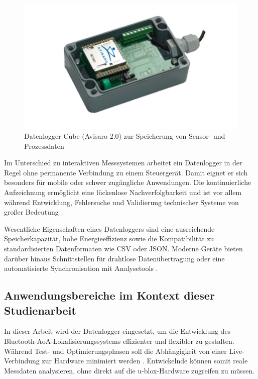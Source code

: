 \documentclass[a4paper, 12pt]{article} %
\begin{document}
\begin{figure}[H]
  \centering
  \includegraphics[width=\linewidth]{images/Datalogger}
  \caption{Datenlogger Cube (Avisaro 2.0) zur Speicherung von Sensor- und Prozessdaten \cite{wikipedia-datalogger}}
  \label{fig:datenlogger_cube}
\end{figure}

Im Unterschied zu interaktiven Messsystemen arbeitet ein Datenlogger in der Regel ohne permanente Verbindung zu einem Steuergerät.  
Damit eignet er sich besonders für mobile oder schwer zugängliche Anwendungen. Die kontinuierliche Aufzeichnung ermöglicht eine lückenlose 
Nachverfolgbarkeit und ist vor allem während Entwicklung, Fehlersuche und Validierung technischer Systeme von großer Bedeutung \cite{dewesoft2024guide}.

Wesentliche Eigenschaften eines Datenloggers sind eine ausreichende Speicherkapazität, hohe Energieeffizienz sowie die Kompatibilität zu 
standardisierten Datenformaten wie \ac{CSV} oder \ac{JSON}. Moderne Geräte bieten darüber hinaus Schnittstellen für drahtlose Datenübertragung 
oder eine automatisierte Synchronisation mit Analysetools \cite{rs2022guide}.

\subsection{Anwendungsbereiche im Kontext dieser Studienarbeit}
In dieser Arbeit wird der Datenlogger eingesetzt, um die Entwicklung des Bluetooth-\ac{AoA}-Lokalisierungssystems effizienter und flexibler zu gestalten.  
Während Test- und Optimierungsphasen soll die Abhängigkeit von einer Live-Verbindung zur Hardware minimiert werden \cite{poole2020data}.  
Entwickelnde können somit reale Messdaten analysieren, ohne direkt auf die u-blox-Hardware zugreifen zu müssen.
\end{document}
